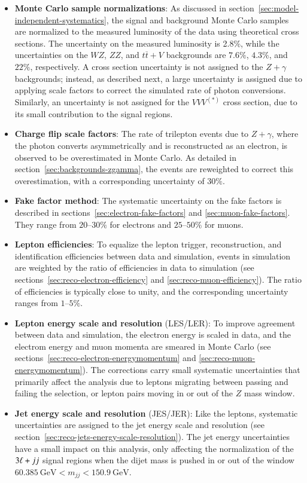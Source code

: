 \begin{itemize}
	\item \textbf{Monte Carlo sample normalizations}: As discussed in section~\ref{sec:model-independent-systematics}, the signal and background Monte Carlo samples are normalized to the measured luminosity of the data using theoretical cross sections. The uncertainty on the measured luminosity is 2.8\%, while the uncertainties on the $WZ$, $ZZ$, and $t\overline{t}+V$ backgrounds are $7.6\%$, $4.3\%$, and $22\%$, respectively. A cross section uncertainty is not assigned to the $Z+\gamma$ backgrounds; instead, as described next, a large uncertainty is assigned due to applying scale factors to correct the simulated rate of photon conversions. Similarly, an uncertainty is not assigned for the $VVV^{(*)}$ cross section, due to its small contribution to the signal regions. 

	\item \textbf{Charge flip scale factors}: The rate of trilepton events due to $Z+\gamma$, where the photon converts asymmetrically and is reconstructed as an electron, is observed to be overestimated in Monte Carlo. As detailed in section~\ref{sec:backgrounds-zgamma}, the events are reweighted to correct this overestimation, with a corresponding uncertainty of $30\%$.

	\item \textbf{Fake factor method}: The systematic uncertainty on the fake factors is described in sections~\ref{sec:electron-fake-factors} and \ref{sec:muon-fake-factors}. They range from $20$--$30\%$ for electrons and $25$--$50\%$ for muons. 

	\item \textbf{Lepton efficiencies}: To equalize the lepton trigger, reconstruction, and identification efficiencies between data and simulation, events in simulation are weighted by the ratio of efficiencies in data to simulation (see sections~\ref{sec:reco-electron-efficiency} and \ref{sec:reco-muon-efficiency}). The ratio of efficiencies is typically close to unity, and the corresponding uncertainty ranges from $1$--$5\%$.

	\item \textbf{Lepton energy scale and resolution} (LES/LER): To improve agreement between data and simulation, the electron energy is scaled in data, and the electrom energy and muon momenta are smeared in Monte Carlo (see sections~\ref{sec:reco-electron-energymomentum} and \ref{sec:reco-muon-energymomentum}). The corrections carry small systematic uncertainties that primarily affect the analysis due to leptons migrating between passing and failing the selection, or lepton pairs moving in or out of the $Z$ mass window. 

	\item \textbf{Jet energy scale and resolution} (JES/JER): Like the leptons, systematic uncertainties are assigned to the jet energy scale and resolution (see section~\ref{sec:reco-jets-energy-scale-resolution}). The jet energy uncertainties have a small impact on this analysis, only affecting the normalization of the $3\ell+jj$ signal regions when the dijet mass is pushed in or out of the window $\SI{60.385}{\giga\electronvolt}<m_{jj}<\SI{150.9}{\giga\electronvolt}$. 
\end{itemize}


